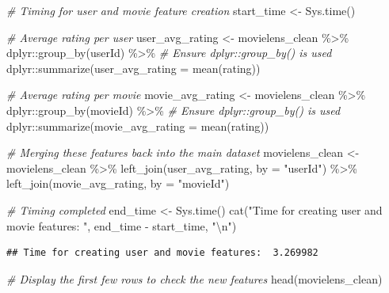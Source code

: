 \documentclass[
]{article}
\newenvironment{Shaded}{}{}
\newcommand{\AttributeTok}[1]{\textcolor[rgb]{0.49,0.56,0.16}{#1}}
\newcommand{\CommentTok}[1]{\textcolor[rgb]{0.38,0.63,0.69}{\textit{#1}}}
\newcommand{\FunctionTok}[1]{\textcolor[rgb]{0.02,0.16,0.49}{#1}}
\newcommand{\NormalTok}[1]{#1}
\newcommand{\OtherTok}[1]{\textcolor[rgb]{0.00,0.44,0.13}{#1}}
\newcommand{\SpecialCharTok}[1]{\textcolor[rgb]{0.25,0.44,0.63}{#1}}
\newcommand{\StringTok}[1]{\textcolor[rgb]{0.25,0.44,0.63}{#1}}
\begin{document}
\begin{Shaded}
\begin{Highlighting}[]
\CommentTok{\# Timing for user and movie feature creation}
\NormalTok{start\_time }\OtherTok{\textless{}{-}} \FunctionTok{Sys.time}\NormalTok{()}

\CommentTok{\# Average rating per user}
\NormalTok{user\_avg\_rating }\OtherTok{\textless{}{-}}\NormalTok{ movielens\_clean }\SpecialCharTok{\%\textgreater{}\%}
\NormalTok{  dplyr}\SpecialCharTok{::}\FunctionTok{group\_by}\NormalTok{(userId) }\SpecialCharTok{\%\textgreater{}\%}  \CommentTok{\# Ensure dplyr::group\_by() is used}
\NormalTok{  dplyr}\SpecialCharTok{::}\FunctionTok{summarize}\NormalTok{(}\AttributeTok{user\_avg\_rating =} \FunctionTok{mean}\NormalTok{(rating))}

\CommentTok{\# Average rating per movie}
\NormalTok{movie\_avg\_rating }\OtherTok{\textless{}{-}}\NormalTok{ movielens\_clean }\SpecialCharTok{\%\textgreater{}\%}
\NormalTok{  dplyr}\SpecialCharTok{::}\FunctionTok{group\_by}\NormalTok{(movieId) }\SpecialCharTok{\%\textgreater{}\%}  \CommentTok{\# Ensure dplyr::group\_by() is used}
\NormalTok{  dplyr}\SpecialCharTok{::}\FunctionTok{summarize}\NormalTok{(}\AttributeTok{movie\_avg\_rating =} \FunctionTok{mean}\NormalTok{(rating))}

\CommentTok{\# Merging these features back into the main dataset}
\NormalTok{movielens\_clean }\OtherTok{\textless{}{-}}\NormalTok{ movielens\_clean }\SpecialCharTok{\%\textgreater{}\%}
  \FunctionTok{left\_join}\NormalTok{(user\_avg\_rating, }\AttributeTok{by =} \StringTok{"userId"}\NormalTok{) }\SpecialCharTok{\%\textgreater{}\%}
  \FunctionTok{left\_join}\NormalTok{(movie\_avg\_rating, }\AttributeTok{by =} \StringTok{"movieId"}\NormalTok{)}

\CommentTok{\# Timing completed}
\NormalTok{end\_time }\OtherTok{\textless{}{-}} \FunctionTok{Sys.time}\NormalTok{()}
\FunctionTok{cat}\NormalTok{(}\StringTok{"Time for creating user and movie features: "}\NormalTok{, end\_time }\SpecialCharTok{{-}}\NormalTok{ start\_time, }\StringTok{"}\SpecialCharTok{\textbackslash{}n}\StringTok{"}\NormalTok{)}
\end{Highlighting}
\end{Shaded}

\begin{verbatim}
## Time for creating user and movie features:  3.269982
\end{verbatim}

\begin{Shaded}
\begin{Highlighting}[]
\CommentTok{\# Display the first few rows to check the new features}
\FunctionTok{head}\NormalTok{(movielens\_clean)}
\end{Highlighting}
\end{Shaded}
\end{document}
